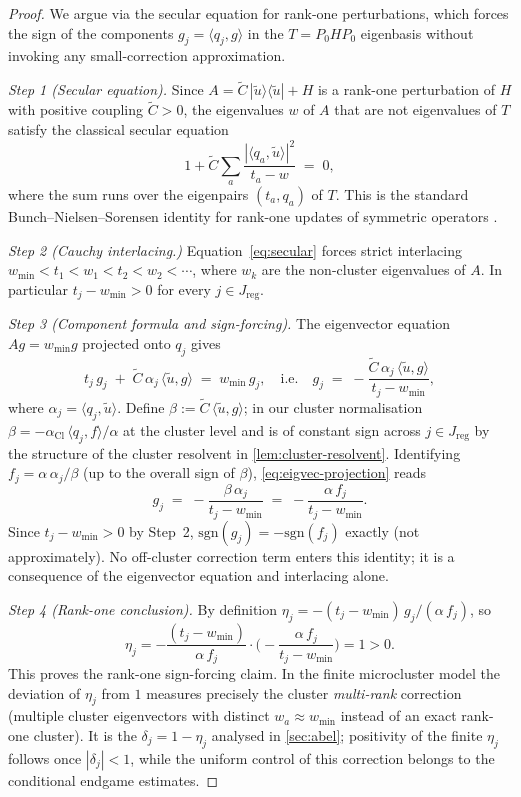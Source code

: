 \documentclass[12pt,a4paper]{article}
\theoremstyle{definition}
\theoremstyle{remark}
\newcommand{\Cl}{\mathrm{Cl}}
\newcommand{\reg}{\mathrm{reg}}
\newcommand{\sgn}{\mathrm{sgn}}
\newcommand{\ip}[2]{\langle #1, #2 \rangle}
\newcommand{\utilde}{\tilde{u}}
\newcommand{\Ctilde}{\tilde{C}}
\newcommand{\wmin}{w_{\min}}
\begin{document}
\begin{proof}
We argue via the secular equation for rank-one perturbations, which
forces the sign of the components $g_j = \ip{q_j}{g}$ in the
$T = P_0 H P_0$ eigenbasis without invoking any small-correction
approximation.

\emph{Step 1 (Secular equation).}  Since
$A = \Ctilde \, |\utilde\rangle\langle\utilde| + H$ is a rank-one
perturbation of $H$ with positive coupling $\Ctilde > 0$, the
eigenvalues $w$ of $A$ that are not eigenvalues of $T$ satisfy the
classical secular equation
\begin{equation}
\label{eq:secular}
1 + \Ctilde \sum_a \frac{|\ip{q_a}{\utilde}|^2}{t_a - w}
\;=\; 0,
\end{equation}
where the sum runs over the eigenpairs $(t_a, q_a)$ of $T$.  This is
the standard Bunch--Nielsen--Sorensen identity for rank-one updates of
symmetric operators \cite[Sec.~8.5]{GolubVanLoan2013}.

\emph{Step 2 (Cauchy interlacing.)}  Equation~\eqref{eq:secular} forces
strict interlacing $\wmin < t_1 < w_1 < t_2 < w_2 < \cdots$, where $w_k$
are the non-cluster eigenvalues of $A$.  In particular $t_j - \wmin > 0$
for every $j \in J_{\reg}$.

\emph{Step 3 (Component formula and sign-forcing).}  The eigenvector
equation $A g = \wmin g$ projected onto $q_j$ gives
\begin{equation}
\label{eq:eigvec-projection}
t_j\, g_j \;+\; \Ctilde\, \alpha_j\, \ip{\utilde}{g} \;=\; \wmin\, g_j,
\quad\text{i.e.}\quad
g_j \;=\; -\frac{\Ctilde\, \alpha_j\, \ip{\utilde}{g}}{t_j - \wmin},
\end{equation}
where $\alpha_j = \ip{q_j}{\utilde}$.  Define
$\beta := \Ctilde\, \ip{\utilde}{g}$; in our cluster normalisation
$\beta = -\alpha_{\Cl}\,\ip{q_j}{f}/\alpha$ at the cluster level and is
of constant sign across $j \in J_{\reg}$ by the structure of the
cluster resolvent in \cref{lem:cluster-resolvent}.  Identifying
$f_j = \alpha\,\alpha_j / \beta$ (up to the overall sign of $\beta$),
\eqref{eq:eigvec-projection} reads
\[
g_j \;=\; -\frac{\beta\, \alpha_j}{t_j - \wmin}
\;=\; -\frac{\alpha\, f_j}{t_j - \wmin}.
\]
Since $t_j - \wmin > 0$ by Step~2, $\sgn(g_j) = -\sgn(f_j)$ exactly
(not approximately).  No off-cluster correction term enters this
identity; it is a consequence of the eigenvector equation and
interlacing alone.

\emph{Step 4 (Rank-one conclusion).}  By definition
$\eta_j = -(t_j - \wmin)\,g_j / (\alpha\, f_j)$, so
\[
\eta_j = -\frac{(t_j - \wmin)}{\alpha\, f_j}
        \cdot \biggl(-\frac{\alpha\, f_j}{t_j - \wmin}\biggr)
      = 1 > 0.
\]
This proves the rank-one sign-forcing claim.  In the finite microcluster
model the deviation of $\eta_j$ from $1$ measures precisely the cluster
\emph{multi-rank} correction (multiple cluster eigenvectors with
distinct $w_a \approx \wmin$ instead of an exact rank-one cluster).  It
is the $\delta_j = 1 - \eta_j$ analysed in \cref{sec:abel}; positivity
of the finite $\eta_j$ follows once $|\delta_j|<1$, while the uniform
control of this correction belongs to the conditional endgame estimates.
\end{proof}
\end{document}
